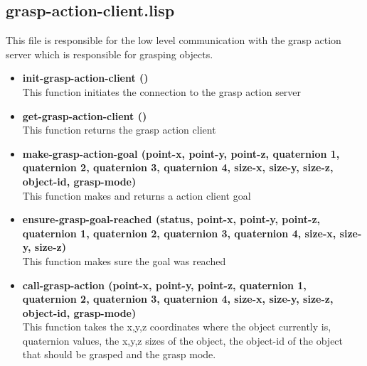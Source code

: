 \documentclass[main.tex]{subfiles}
\begin{document}
		\subsection{grasp-action-client.lisp}
		This file is responsible for the low level communication with the
		grasp action server which is responsible for grasping objects.
		\begin{itemize}
			\item \textbf{init-grasp-action-client ()} \\
			This function initiates the connection to the grasp action server
			\item \textbf{get-grasp-action-client ()} \\
			This function returns the grasp action client
			\item \textbf{make-grasp-action-goal (point-x, point-y, point-z, quaternion 1, quaternion 2, quaternion 3, quaternion 4, size-x, size-y, size-z, object-id, grasp-mode)} \\
			This function makes and returns a action client goal
			\item \textbf{ensure-grasp-goal-reached (status, point-x, point-y, point-z, quaternion 1, quaternion 2, quaternion 3, quaternion 4, size-x, size-y, size-z)} \\
            This function makes sure the goal was reached
			\item \textbf{call-grasp-action (point-x, point-y, point-z, quaternion 1, quaternion 2, quaternion 3, quaternion 4, size-x, size-y, size-z, object-id, grasp-mode)} \\
			This function takes the x,y,z coordinates where the object currently is, quaternion values, the x,y,z sizes of the object, the object-id of the object that should be grasped and the grasp mode.
		\end{itemize}
\end{document}
